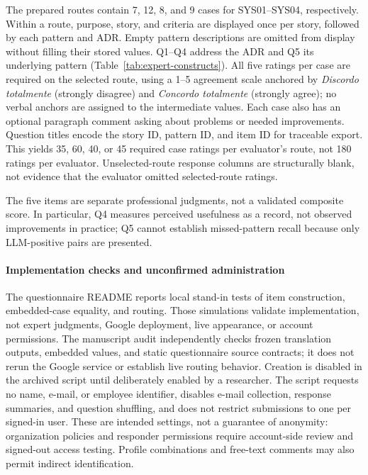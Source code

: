 The prepared routes contain 7, 12, 8, and 9 cases for SYS01--SYS04,
respectively. Within a route, purpose, story, and criteria are displayed once
per story, followed by each pattern and ADR. Empty pattern descriptions are
omitted from display without filling their stored values. Q1--Q4 address
the ADR and Q5 its underlying pattern (Table~\ref{tab:expert-constructs}).
All five ratings per case are required on the selected route, using a
1--5 agreement scale anchored by \emph{Discordo totalmente} (strongly disagree)
and \emph{Concordo totalmente} (strongly agree); no verbal anchors are assigned
to the intermediate values. Each case also has an optional paragraph comment
asking about problems or needed improvements. Question titles encode the
story ID, pattern ID, and item ID for traceable export. This yields 35, 60,
40, or 45 required case ratings per evaluator's route, not 180 ratings
per evaluator. Unselected-route response columns are structurally blank,
not evidence that the evaluator omitted selected-route ratings.


The five items are separate professional judgments, not a validated composite
score. In particular, Q4 measures perceived usefulness as a record, not
observed improvements in practice; Q5 cannot establish missed-pattern recall
because only LLM-positive pairs are presented.

\paragraph{Implementation checks and unconfirmed administration}
The questionnaire README reports local stand-in tests of item construction,
embedded-case equality, and routing. Those simulations validate implementation,
not expert judgments, Google deployment, live appearance, or account
permissions. The manuscript audit independently checks frozen translation
outputs, embedded values, and static questionnaire source contracts; it does
not rerun the Google service or establish live routing behavior.
Creation is disabled in the archived script until deliberately enabled by a
researcher. The script requests no name, e-mail, or employee identifier,
disables e-mail collection, response summaries, and question shuffling, and
does not restrict submissions to one per signed-in user. These are intended
settings, not a guarantee of anonymity: organization policies and responder
permissions require account-side review and signed-out access testing.
Profile combinations and free-text comments may also permit indirect
identification.


